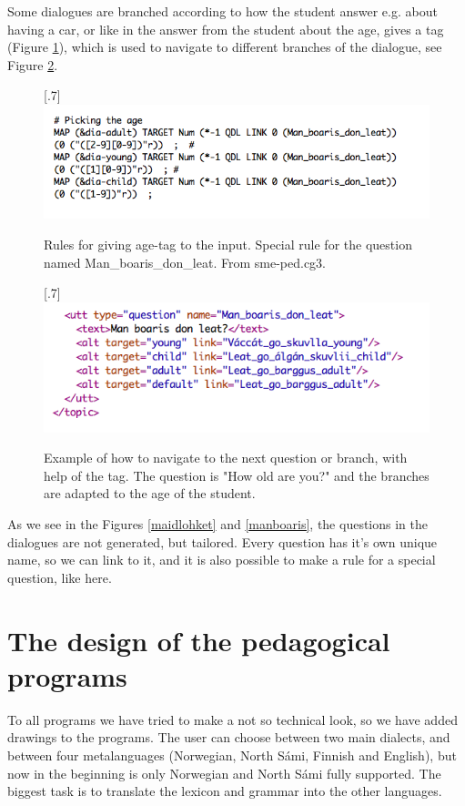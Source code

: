 \documentclass[a4paper,12pt]{article}
\begin{document}
Some dialogues are branched according to how the student answer e.g. about having a car, or like in the answer from the student about the age, gives a tag (Figure \ref{age}), which is used to navigate to different branches of the dialogue, see Figure \ref{branch}.


\begin{figure}[htbp]
\begin{center}
\scalebox{.7}[.7]{\includegraphics{img/picking_age.png}}\\
\caption{Rules for giving age-tag to the input. Special rule for the question named Man\_boaris\_don\_leat. From sme-ped.cg3.}
\label{age}
\end{center}
\end{figure}


\begin{figure}[htbp]
\begin{center}
\scalebox{.7}[.7]{\includegraphics{img/Man_boaris.png}}\\
\caption{Example of how to navigate to the next question or branch, with help of the tag.  The question is "How old are you?" and the branches are adapted to the age of the student.}
\label{branch}
\end{center}
\end{figure}

As we see in the Figures \ref{maidlohket} and \ref{manboaris}, the questions in the dialogues are not generated, but tailored. Every question has it's own unique name, so we can link to it, and it is also possible to make a rule for a special question, like here.  

\section{The design of the pedagogical programs}
To all programs we have tried to make a not so technical look, so we have added drawings to the programs. The user can choose between two main dialects, and between four metalanguages (Norwegian, North Sámi, Finnish and English), but now in the beginning is only Norwegian and North Sámi fully supported. The biggest task is to translate the lexicon and grammar into the other languages.  
\end{document}
